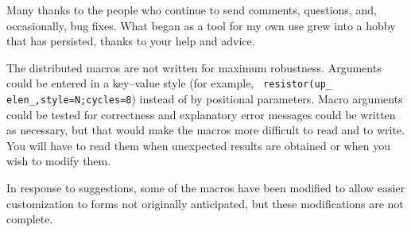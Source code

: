 Many thanks to the people who continue to send comments, questions,
and, occasionally, bug fixes. What began as a tool for my own use grew
into a hobby that has persisted, thanks to your help and advice.

\label{Bugs:}
The distributed macros are not written for maximum robustness.
Arguments could be entered in a key--value style (for example, {\tt
resistor(up\_ elen\_,style=N;cycles=8}) instead of by positional
parameters.  Macro arguments could be tested for correctness and
explanatory error messages could be written as necessary, but that
would make the macros more difficult to read and to write.  You will
have to read them when unexpected results are obtained or when you wish
to modify them.

In response to suggestions, some of the macros have been modified to
allow easier customization to forms not originally anticipated, but
these modifications are not complete.

